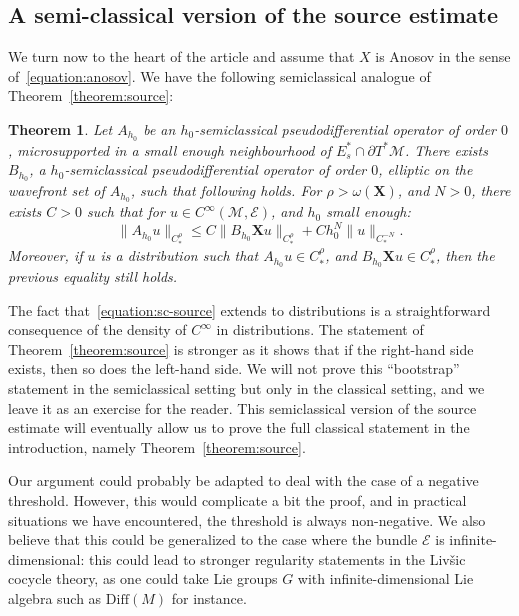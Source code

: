 \documentclass[10pt]{amsart}
\newtheorem{theo}{Theorem}[section]
\theoremstyle{definition}\newtheorem{defi}[theo]{Definition}\newtheorem{rema}[theo]{Remark}\newtheorem{exam}[theo]{Example}\newtheorem{exem}[theo]{Example}\newtheorem{nota}[theo]{Notation}
\newcommand{\X}{\mathbf{X}}
\newcommand{\M}{\mathcal{M}}
\newcommand{\E}{\mathcal{E}}
\newcommand{\Diff}{\mathrm{Diff}}
\begin{document}
\subsection{A semi-classical version of the source estimate}

We turn now to the heart of the article and assume that $X$ is Anosov in the sense of~\eqref{equation:anosov}. We have the following semiclassical analogue of Theorem~\ref{theorem:source}:

\begin{theo}\label{theorem:sc-source}
Let $A_{h_0}$ be an $h_0$-semiclassical pseudodifferential operator of order $0$, microsupported in a small enough neighbourhood of $E^\ast_s \cap \partial T^*\M$. There exists $B_{h_0}$, a $h_0$-semiclassical pseudodifferential operator of order $0$, elliptic on the wavefront set of $A_{h_0}$, such that following holds. For $\rho>\omega(\X)$, and $N>0$, there exists $C>0$ such that for $u\in C^\infty(\M,\E)$, and $h_0$ small enough:
\begin{equation}\label{equation:sc-source}
\| A_{h_0} u\|_{C^\rho_\ast} \leq C \| B_{h_0} \X u \|_{C^\rho_\ast} + Ch_0^N \| u \|_{C_*^{-N}}.
\end{equation}
Moreover, if $u$ is a distribution such that $A_{h_0} u \in C^\rho_\ast$, and $B_{h_0} \X u \in C^\rho_\ast$, then the previous equality still holds.
\end{theo}

The fact that~\eqref{equation:sc-source} extends to distributions is a straightforward consequence of the density of $C^\infty$ in distributions. The statement of Theorem~\ref{theorem:source} is stronger as it shows that if the right-hand side exists, then so does the left-hand side. We will not prove this ``bootstrap'' statement in the semiclassical setting but only in the classical setting, and we leave it as an exercise for the reader. This semiclassical version of the source estimate will eventually allow us to prove the full classical statement in the introduction, namely Theorem~\ref{theorem:source}.


Our argument could probably be adapted to deal with the case of a negative threshold. However, this would complicate a bit the proof, and in practical situations we have encountered, the threshold is always non-negative. We also believe that this could be generalized to the case where the bundle $\E$ is infinite-dimensional: this could lead to stronger regularity statements in the Liv{\v s}ic cocycle theory, as one could take Lie groups $G$ with infinite-dimensional Lie algebra such as $\Diff(M)$ for instance.
\end{document}
